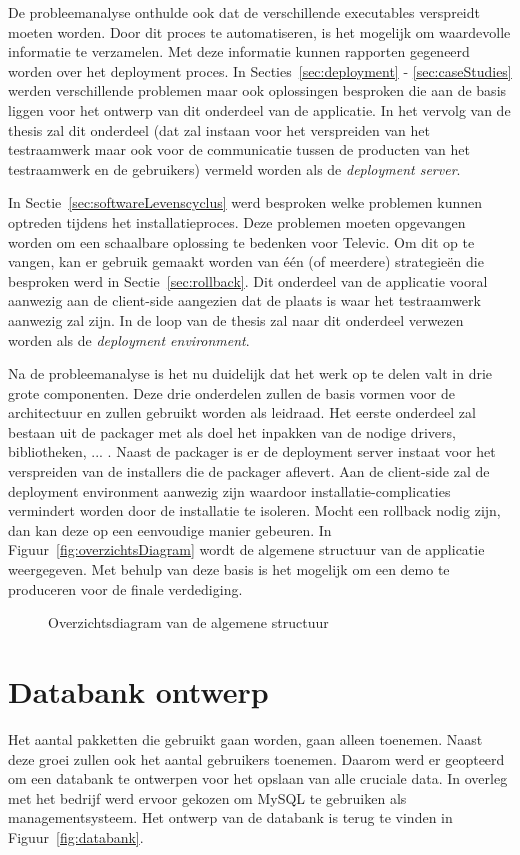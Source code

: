 De probleemanalyse onthulde ook dat de verschillende executables verspreidt moeten worden.
Door dit proces te automatiseren, is het mogelijk om waardevolle informatie te verzamelen.
Met deze informatie kunnen rapporten gegeneerd worden over het deployment proces.
In Secties~\ref{sec:deployment} - \ref{sec:caseStudies} werden verschillende problemen maar ook oplossingen besproken die aan de basis liggen voor het ontwerp van dit onderdeel van de applicatie. 
In het vervolg van de thesis zal dit onderdeel (dat zal instaan voor het verspreiden van het testraamwerk maar ook voor de communicatie tussen de producten van het testraamwerk en de gebruikers) vermeld worden als de \emph{deployment server}.

In Sectie~\vref{sec:softwareLevenscyclus} werd besproken welke problemen kunnen optreden tijdens het installatieproces.
Deze problemen moeten opgevangen worden om een schaalbare oplossing te bedenken voor Televic.
Om dit op te vangen, kan er gebruik gemaakt worden van één (of meerdere) strategieën die besproken werd in Sectie~\vref{sec:rollback}.
Dit onderdeel van de applicatie vooral aanwezig aan de client-side aangezien dat de plaats is waar het testraamwerk aanwezig zal zijn.
In de loop van de thesis zal naar dit onderdeel verwezen worden als de \emph{deployment environment}.

Na de probleemanalyse is het nu duidelijk dat het werk op te delen valt in drie grote componenten.
Deze drie onderdelen zullen de basis vormen voor de architectuur en zullen gebruikt worden als leidraad.
Het eerste onderdeel zal bestaan uit de packager met als doel het inpakken van de nodige drivers, bibliotheken, ... .
Naast de packager is er de deployment server instaat voor het verspreiden van de installers die de packager aflevert.
Aan de client-side zal de deployment environment aanwezig zijn waardoor installatie-complicaties vermindert worden door de installatie te isoleren.
Mocht een rollback nodig zijn, dan kan deze op een eenvoudige manier gebeuren.
In Figuur~\vref{fig:overzichtsDiagram} wordt de algemene structuur van de applicatie weergegeven.
Met behulp van deze basis is het mogelijk om een demo te produceren voor de finale verdediging.

\begin{figure}[!hbt]
\centering
  
  \caption{Overzichtsdiagram van de algemene structuur}
  \label{fig:overzichtsDiagram}
\end{figure}

\section{Databank ontwerp}\label{sec:databank}
Het aantal pakketten die gebruikt gaan worden, gaan alleen toenemen.
Naast deze groei zullen ook het aantal gebruikers toenemen.
Daarom werd er geopteerd om een databank te ontwerpen voor het opslaan van alle cruciale data.
In overleg met het bedrijf werd ervoor gekozen om MySQL te gebruiken als managementsysteem.
Het ontwerp van de databank is terug te vinden in Figuur~\vref{fig:databank}.

